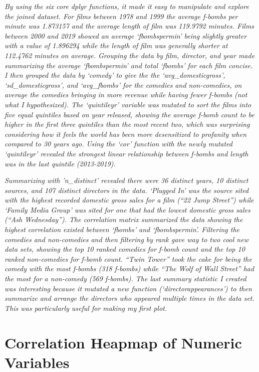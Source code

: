 \documentclass[]{article}
\begin{document}
\emph{By using the six core dplyr functions, it made it easy to
manipulate and explore the joined dataset. For films between 1978 and
1999 the average f-bombs per minute was 1.873157 and the average length
of film was 119.9792 minutes. Films between 2000 and 2019 showed an
average `fbombspermin' being slightly greater with a value of 1.896294
while the length of film was generally shorter at 112.4762 minutes on
average. Grouping the data by film, director, and year made summarizing
the average `fbombspermin' and total `fbombs' for each film concise. I
then grouped the data by `comedy' to give the the `avg\_domesticgross',
`sd\_domesticgross', and `avg\_fbombs' for the comedies and
non-comedies, on average the comedies bringing in more revenue while
having fewer f-bombs (not what I hypothesized). The `quintileyr'
variable was mutated to sort the films into five equal quintiles based
on year released, showing the average f-bomb count to be higher in the
first three quintiles than the most recent two, which was surprising
considering how it feels the world has been more desensitized to
profanity when compared to 30 years ago. Using the `cor' function with
the newly mutated `quintileyr' revealed the strongest linear
relationship between f-bombs and length was in the last quintile
(2013-2019).}

\emph{Summarizing with 'n\_distinct' revealed there were 36 distinct
years, 10 distinct sources, and 107 distinct directors in the data.
`Plugged In' was the source sited with the highest recorded domestic
gross sales for a film (``22 Jump Street'') while `Family Media Group'
was sited for one that had the lowest domestic gross sales (``Ash
Wednesday''). The correlation matrix summarized the data showing the
highest correlation existed between `fbombs' and `fbombspermin'.
Filtering the comedies and non-comedies and then filtering by rank gave
way to two cool new data sets, showing the top 10 ranked comedies for
f-bomb count and the top 10 ranked non-comedies for f-bomb count. ``Twin
Tower'' took the cake for being the comedy with the most f-bombs (318
f-bombs) while ``The Wolf of Wall Street'' had the most for a non-comedy
(569 f-bombs). The last summary statistic I created was interesting
because it mutated a new function (`directorappearances') to then
summarize and arrange the directors who appeared multiple times in the
data set. This was particularly useful for making my first plot.}

\hypertarget{correlation-heapmap-of-numeric-variables}{%
\section{Correlation Heapmap of Numeric
Variables}\label{correlation-heapmap-of-numeric-variables}}
\end{document}
